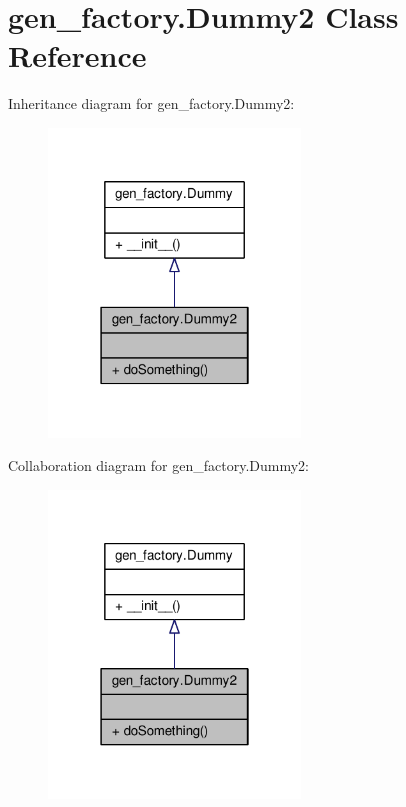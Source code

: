 \hypertarget{classgen__factory_1_1_dummy2}{}\section{gen\+\_\+factory.\+Dummy2 Class Reference}
\label{classgen__factory_1_1_dummy2}


Inheritance diagram for gen\+\_\+factory.\+Dummy2\+:
\nopagebreak
\begin{figure}[H]
\begin{center}
\leavevmode
\includegraphics[width=190pt]{classgen__factory_1_1_dummy2__inherit__graph}
\end{center}
\end{figure}


Collaboration diagram for gen\+\_\+factory.\+Dummy2\+:
\nopagebreak
\begin{figure}[H]
\begin{center}
\leavevmode
\includegraphics[width=190pt]{classgen__factory_1_1_dummy2__coll__graph}
\end{center}
\end{figure}
